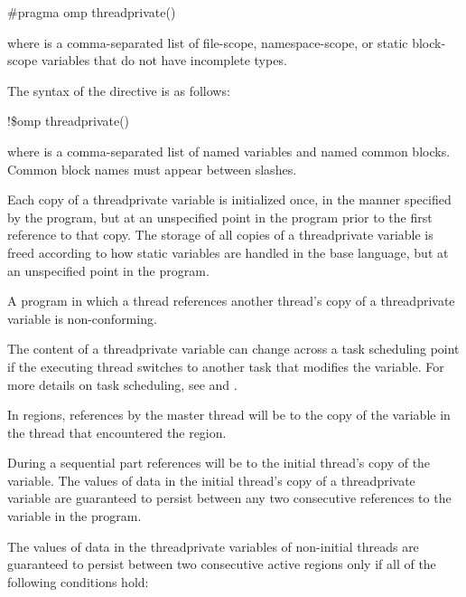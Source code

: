 {{{{\begin{boxedcode}
\#pragma omp threadprivate() 
\end{boxedcode}

where  is a comma-separated list of file-scope, namespace-scope, or static 
block-scope variables that do not have incomplete types.
\ccppspecificend

\begin{samepage}

\fortranspecificstart
The syntax of the  directive is as follows:

\begin{boxedcode}
!\$omp threadprivate()
\end{boxedcode}

where  is a comma-separated list of named variables and named common blocks. 
Common block names must appear between slashes.
\fortranspecificend

\descr
Each copy of a threadprivate variable is initialized once, in the manner specified by the 
program, but at an unspecified point in the program prior to the first reference to that 
copy. The storage of all copies of a threadprivate variable is freed according to how 
static variables are handled in the base language, but at an unspecified point in the 
program.

A program in which a thread references another thread’s copy of a threadprivate variable 
is non-conforming.
\end{samepage}

The content of a threadprivate variable can change across a task scheduling point if the 
executing thread switches to another task that modifies the variable. For more details on 
task scheduling, see 
 and 
.

In  regions, references by the master thread will be to the copy of the 
variable in the thread that encountered the  region. 

During a sequential part references will be to the initial thread’s copy of the variable. 
The values of data in the initial thread’s copy of a threadprivate variable are guaranteed 
to persist between any two consecutive references to the variable in the program. 

\pagebreak

The values of data in the threadprivate variables of non-initial threads 
are guaranteed to persist between two consecutive active  
regions only if all of the following conditions hold:

}}}}
